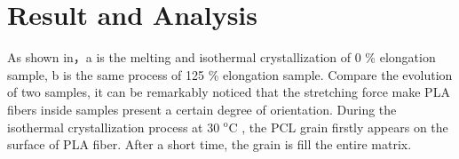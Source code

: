 \documentclass{article}%
\begin{document}
  
  
   
  \label{sec:experiment}
  \section{Result and Analysis} %
  As shown in，a is the melting and isothermal crystallization of 0 \% elongation sample, b is
  the same process of 125 \% elongation sample. Compare the evolution of two samples, it can be
  remarkably noticed that the stretching force make PLA fibers inside samples  present a certain degree of orientation.
  During the isothermal crystallization process at 30 $\mathrm{^o C}$ , the PCL grain firstly appears on the surface of
  PLA fiber. After a short time, the grain is fill the entire matrix.
\end{document}
